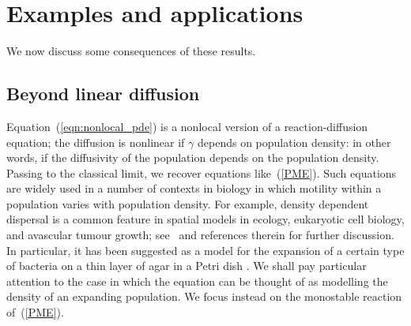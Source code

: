 \documentclass[12pt]{article}
\numberwithin{equation}{section}
\begin{document}
\section{Examples and applications}
\label{sec:applications}

We now discuss some consequences of these results.

\subsection{Beyond linear diffusion}
\label{beyond linear diffusion}

Equation~(\ref{eqn:nonlocal_pde}) is a nonlocal version of a reaction-diffusion equation;
the diffusion is nonlinear if $\gamma$ depends on population density:
in other words, if the diffusivity of the population depends on the population density.
Passing to the classical limit, we recover equations like~(\ref{PME}).
Such equations are widely used in a number of contexts in biology in which
motility within a population varies with population density.
For example, density dependent dispersal is a common feature in spatial
models in ecology, eukaryotic cell biology, and avascular tumour growth;
see~\cite{sherratt:2010} and references therein for further discussion. 
In particular, it has been suggested as a model for
the expansion of a certain type of bacteria %
on a thin layer of agar in a Petri dish 
\citep{cohen/golding/kozlovsky/benjacob/ron:1999}. 
We shall pay particular attention to the case in which the equation can be 
thought of as modelling the density of an expanding population. 
We focus instead on the monostable reaction of~(\ref{PME}).
\end{document}
